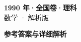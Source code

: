 \documentclass[zihao=-4, a4paper]{ctexart}
\begin{document}
\begin{center}
  {\Large\bfseries 1990 年·全国卷·理科}\\[4pt]
  {\large 数学 · 解析版}
\end{center}
\medskip
{}

\clearpage
{}
\begin{center}{\Large\bfseries 参考答案与详细解析}\end{center}
\medskip

\end{document}
